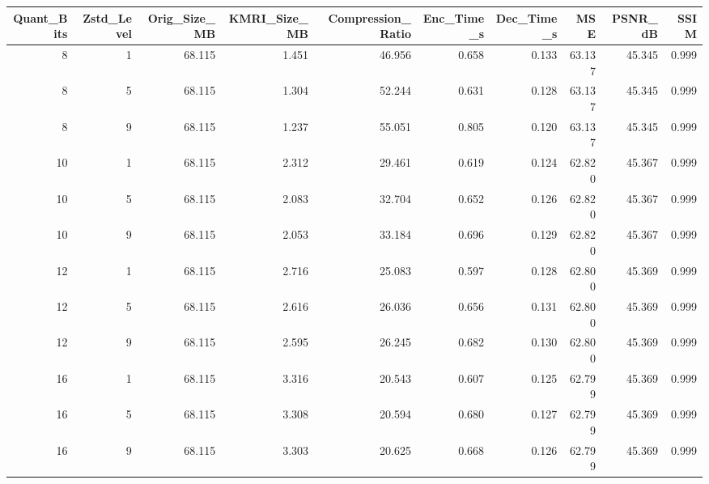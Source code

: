 \begin{tabular}{rrrrrrrrrr}
\toprule
Quant_Bits & Zstd_Level & Orig_Size_MB & KMRI_Size_MB & Compression_Ratio & Enc_Time_s & Dec_Time_s & MSE & PSNR_dB & SSIM \\
\midrule
8 & 1 & 68.115 & 1.451 & 46.956 & 0.658 & 0.133 & 63.137 & 45.345 & 0.999 \\
8 & 5 & 68.115 & 1.304 & 52.244 & 0.631 & 0.128 & 63.137 & 45.345 & 0.999 \\
8 & 9 & 68.115 & 1.237 & 55.051 & 0.805 & 0.120 & 63.137 & 45.345 & 0.999 \\
10 & 1 & 68.115 & 2.312 & 29.461 & 0.619 & 0.124 & 62.820 & 45.367 & 0.999 \\
10 & 5 & 68.115 & 2.083 & 32.704 & 0.652 & 0.126 & 62.820 & 45.367 & 0.999 \\
10 & 9 & 68.115 & 2.053 & 33.184 & 0.696 & 0.129 & 62.820 & 45.367 & 0.999 \\
12 & 1 & 68.115 & 2.716 & 25.083 & 0.597 & 0.128 & 62.800 & 45.369 & 0.999 \\
12 & 5 & 68.115 & 2.616 & 26.036 & 0.656 & 0.131 & 62.800 & 45.369 & 0.999 \\
12 & 9 & 68.115 & 2.595 & 26.245 & 0.682 & 0.130 & 62.800 & 45.369 & 0.999 \\
16 & 1 & 68.115 & 3.316 & 20.543 & 0.607 & 0.125 & 62.799 & 45.369 & 0.999 \\
16 & 5 & 68.115 & 3.308 & 20.594 & 0.680 & 0.127 & 62.799 & 45.369 & 0.999 \\
16 & 9 & 68.115 & 3.303 & 20.625 & 0.668 & 0.126 & 62.799 & 45.369 & 0.999 \\
\bottomrule
\end{tabular}
